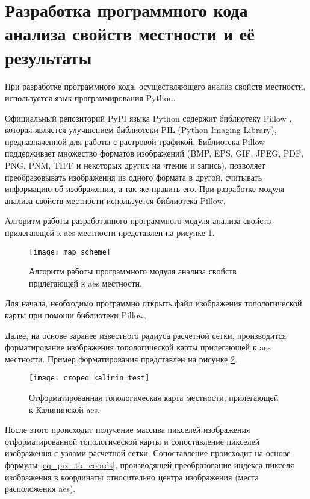 \section{Разработка программного кода анализа свойств местности и её результаты}

При разработке программного кода, осуществляющего анализ свойств местности, используется язык программирования Python. 

Официальный репозиторий PyPI языка Python содержит библиотеку Pillow \cite{pillow}, которая является улучшением 
библиотеки PIL (Python Imaging Library), предназначенной для работы с растровой графикой. Библиотека Pillow 
поддерживает множество форматов изображений (BMP, EPS, GIF, JPEG, PDF, PNG, PNM, TIFF и некоторых других на чтение и 
запись), позволяет преобразовывать изображения из одного формата в другой, считывать информацию об изображении, а так 
же править его. При разработке модуля анализа свойств местности используется библиотека Pillow.

Алгоритм работы разработанного программного модуля анализа свойств прилегающей к \ac{aes} местности представлен на 
рисунке \ref{fig_alg_map_scheme}.

\begin{figure}[ht]
\centering
    \texttt{[image: map\_scheme]}
    \captionsetup{justification=centering}
    \caption{Алгоритм работы программного модуля анализа свойств прилегающей к \ac{aes} местности.}
    \label{fig_alg_map_scheme}
\end{figure}

Для начала, необходимо программно открыть файл изображения топологической карты при помощи библиотеки Pillow.

Далее, на основе заранее известного радиуса расчетной сетки, производится форматирование изображения топологической 
карты прилегающей к \ac{aes} местности. Пример форматирования представлен на рисунке \ref{fig_cropped_map_scheme}.

\begin{figure}[ht]
\centering
    \texttt{[image: croped\_kalinin\_test]}
    \captionsetup{justification=centering}
    \caption{Отформатированная топологическая карта местности, прилегающей к Калининской \ac{aes}.}
    \label{fig_cropped_map_scheme}
\end{figure}

После этого происходит получение массива пикселей изображения отформатированной топологической карты и сопоставление 
пикселей изображения с узлами расчетной сетки. Сопоставление происходит на основе формулы \ref{eq_pix_to_coords}, 
производящей преобразование индекса пикселя изображения в координаты относительно центра изображения (места расположения 
\ac{aes}).

